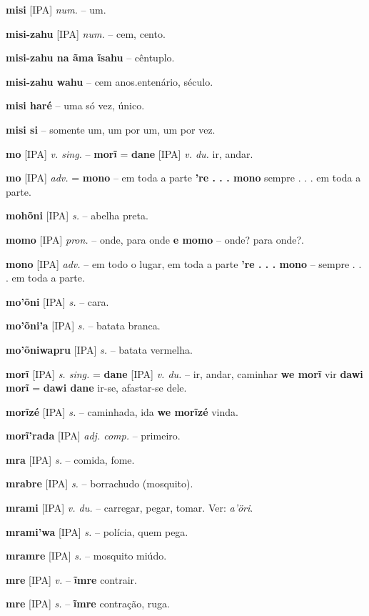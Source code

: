 \textbf{misi} [IPA] \textit{num.} -- um.

\textbf{misi-zahu} [IPA] \textit{num.} -- cem, cento.

\textbf{misi-zahu na ãma ĩsahu} -- cêntuplo.

\textbf{misi-zahu wahu} -- cem anos.entenário, século.

\textbf{misi haré} -- uma só vez, único.

\textbf{misi si} -- somente um, um por um, um por vez.

\textbf{mo} [IPA] \textit{v. sing.} -- \textbf{morĩ} = \textbf{dane} [IPA] \textit{v. du.} ir, andar.

\textbf{mo} [IPA] \textit{adv.} = \textbf{mono} -- em toda a parte  \textbf{'re . . . mono} sempre . . . em toda a parte.

\textbf{mohõni} [IPA] \textit{s.} -- abelha preta.

\textbf{momo} [IPA] \textit{pron.} -- onde, para onde  \textbf{e momo} -- onde? para onde?.

\textbf{mono} [IPA] \textit{adv.} -- em todo o lugar, em toda a parte  \textbf{'re . . . mono} -- sempre . . . em toda a parte.

\textbf{mo'õni} [IPA] \textit{s.} -- cara.

\textbf{mo'õni'a} [IPA] \textit{s.} -- batata branca.

\textbf{mo'õniwapru} [IPA] \textit{s.} -- batata vermelha.

\textbf{morĩ} [IPA] \textit{s. sing.} = \textbf{dane} [IPA] \textit{v. du.} -- ir, andar, caminhar  \textbf{we morĩ} vir  \textbf{dawi morĩ} = \textbf{dawi dane} ir-se, afastar-se dele.

\textbf{morĩzé} [IPA] \textit{s.} -- caminhada, ida  \textbf{we morĩzé} vinda.

\textbf{morĩ'rada} [IPA] \textit{adj. comp.} -- primeiro.

\textbf{mra} [IPA] \textit{s.} -- comida, fome.

\textbf{mrabre} [IPA] \textit{s.} -- borrachudo (mosquito).

\textbf{mrami} [IPA] \textit{v. du.} -- carregar, pegar, tomar. Ver: \textit{a'öri}.

\textbf{mrami'wa} [IPA] \textit{s.} -- polícia, quem pega.

\textbf{mramre} [IPA] \textit{s.} -- mosquito miúdo.

\textbf{mre} [IPA] \textit{v.} -- \textbf{ĩmre} contrair.

\textbf{mre} [IPA] \textit{s.} -- \textbf{ĩmre} contração, ruga.

